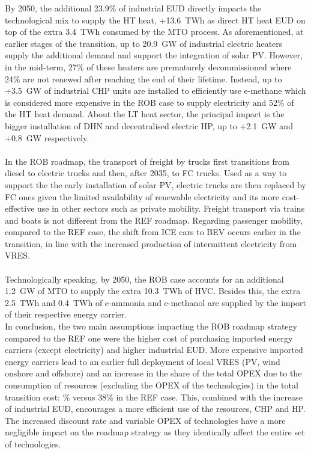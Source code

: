 By 2050, the additional 23.9\% of industrial \gls{EUD} directly impacts the technological mix to supply the \gls{HT} heat, \ie +13.6~TWh as direct \gls{HT} heat \gls{EUD} on top of the extra 3.4~TWh consumed by the \gls{MTO} process. As aforementioned, at earlier stages of the transition, up to 20.9~GW of industrial electric heaters supply the additional demand and support the integration of solar \gls{PV}.  However, in the mid-term, 27\% of these heaters are prematurely decommissioned where 24\% are not renewed after reaching the end of their lifetime. Instead, up to +3.5~GW of industrial \gls{CHP} units are installed to efficiently use e-methane which is considered more expensive in the ROB case to supply electricity and 52\% of the \gls{HT} heat demand. About the \gls{LT} heat sector, the principal impact is the bigger installation of \gls{DHN} and decentralised electric \gls{HP}, up to +2.1~GW and +0.8~GW respectively. \\

\\

In the ROB roadmap, the transport of freight by trucks first transitions from diesel to electric trucks and then, after 2035, to \gls{FC} trucks. Used as a way to support the the early installation of solar \gls{PV}, electric trucks are then replaced by \gls{FC} ones given the limited availability of renewable electricity and its more cost-effective use in other sectors such as private mobility. Freight transport via trains and boats is not different from the REF roadmap. Regarding passenger mobility, compared to the REF case, the shift from \gls{ICE} cars to \gls{BEV} occurs earlier in the transition, in line with the increased production of intermittent electricity from \gls{VRES}. \\

\\

Technologically speaking, by 2050, the ROB case accounts for an additional 1.2~GW of \gls{MTO} to supply the extra 10.3~TWh of \gls{HVC}. Besides this, the extra 2.5~TWh and 0.4~TWh of e-ammonia and e-methanol are supplied by the import of their respective energy carrier.\\

In conclusion, the two main assumptions impacting the ROB roadmap strategy compared to the REF one were the higher cost of purchasing imported energy carriers (except electricity) and higher industrial \gls{EUD}. More expensive imported energy carriers lead to an earlier full deployment of local \gls{VRES} (\ie \gls{PV}, wind onshore and offshore) and an increase in the share of the total OPEX due to the consumption of resources (\ie excluding the OPEX of the technologies) in the total transition cost: \% versus 38\% in the REF case. This, combined with the increase of industrial \gls{EUD}, encourages a more efficient use of the resources, \ie \gls{CHP} and \gls{HP}. The increased discount rate and variable OPEX of technologies have a more negligible impact on the roadmap strategy as they identically affect the entire set of technologies.

